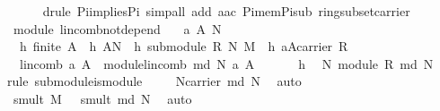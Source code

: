 \begin{isabellebody}
\ \ \ \ \ \isamarkupfalse%
\ {\isacharparenleft}drule\ Pi{\isacharunderscore}implies{\isacharunderscore}Pi{}{\isacharcomma}\ simp{\isacharunderscore}all\ add{\isacharcolon}\ a{\isacharunderscore}ac\ Pi{\isacharunderscore}mem{\isacharunderscore}Pi{}{\isacharunderscore}sub{}\ ring{\isacharunderscore}subset{\isacharunderscore}carrier{\isacharparenright}{\isacharplus}\isanewline
{}\isamarkupfalse%
%
\endisatagproof
{\isafoldproof}%
%
\isadelimproof
\isanewline
%
\endisadelimproof
\isanewline
{}\isamarkupfalse%
\ {\isacharparenleft}\ module{\isacharparenright}\ lincomb{\isacharunderscore}not{\isacharunderscore}depend{\isacharcolon}\isanewline
\ \ \ a\ A\ N\isanewline
\ \ \ h{}{\isacharcolon}\ {\isachardoublequoteopen}finite\ A{\isachardoublequoteclose}\ \ h{}{\isacharcolon}\ {\isachardoublequoteopen}A{\isasymsubseteq}N{\isachardoublequoteclose}\ \ h{}{\isacharcolon}\ {\isachardoublequoteopen}submodule\ R\ N\ M{\isachardoublequoteclose}\ \ h{}{\isacharcolon}\ {\isachardoublequoteopen}a{\isacharcolon}A{\isasymrightarrow}carrier\ R{\isachardoublequoteclose}\isanewline
\ \ \ {\isachardoublequoteopen}lincomb\ a\ A\ {\isacharequal}\ module{\isachardot}lincomb\ {\isacharparenleft}md\ N{\isacharparenright}\ a\ A{\isachardoublequoteclose}\isanewline
%
\isadelimproof
%
\endisadelimproof
%
\isatagproof
{}\isamarkupfalse%
\ {\isacharminus}\ \isanewline
\ \ \isamarkupfalse%
\ h{}\ \isamarkupfalse%
\ N{\isacharcolon}\ module\ R\ {\isachardoublequoteopen}{\isacharparenleft}md\ N{\isacharparenright}{\isachardoublequoteclose}\ \isamarkupfalse%
\ {\isacharparenleft}rule\ submodule{\isacharunderscore}is{\isacharunderscore}module{\isacharparenright}\isanewline
\ \ \isamarkupfalse%
\ {}{\isacharcolon}\ {\isachardoublequoteopen}N{\isacharequal}carrier\ {\isacharparenleft}md\ N{\isacharparenright}{\isachardoublequoteclose}\ \isamarkupfalse%
\ auto\isanewline
\ \ \isamarkupfalse%
\ {}{\isacharcolon}\ {\isachardoublequoteopen}{\isacharparenleft}smult\ M\ {\isacharparenright}\ {\isacharequal}\ {\isacharparenleft}smult\ {\isacharparenleft}md\ N{\isacharparenright}{\isacharparenright}{\isachardoublequoteclose}\ \isamarkupfalse%
\ auto\ \isanewline
\ \ \isamarkupfalse%

\end{isabellebody}
